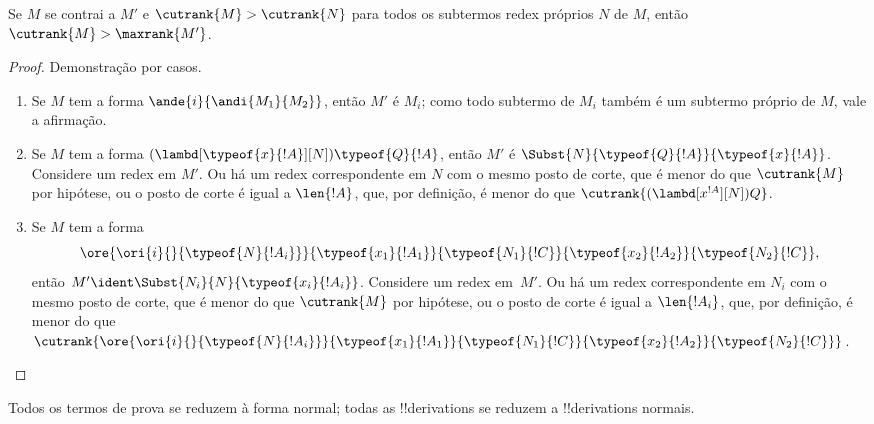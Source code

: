 \documentclass[../../../include/open-logic-section]{subfiles}
\begin{document}
\begin{lem}
  Se $M$ se contrai a $M'$ e $\cutrank{M} > \cutrank{N}$ para todos os
  subtermos redex próprios $N$ de $M$, então $\cutrank{M} >
  \maxrank{M'}$.
\end{lem}

\begin{proof}
  Demonstração por casos.
  \begin{enumerate}
  \item Se $M$ tem a forma $\ande{i}{\andi{M_1}{M_2}}$, então $M'$ é
    $M_i$; como todo subtermo de $M_i$ também é um subtermo próprio de
    $M$, vale a afirmação.
  \item Se $M$ tem a forma
    $(\lambd[\typeof{x}{!A}][N])\typeof{Q}{!A}$, então $M'$ é
    $\Subst{N}{\typeof{Q}{!A}}{\typeof{x}{!A}}$. Considere um redex em
    $M'$. Ou há um redex correspondente em $N$ com o mesmo posto de
    corte, que é menor do que $\cutrank{M}$ por hipótese, ou o posto de
    corte é igual a $\len{!A}$, que, por definição, é menor do que
    $\cutrank{(\lambd[x^{!A}][N])Q}$.
  \item Se $M$ tem a forma
    \[
    \ore{\ori{i}{}{\typeof{N}{!A_i}}}
        {\typeof{x_1}{!A_1}}{\typeof{N_1}{!C}}
        {\typeof{x_2}{!A_2}}{\typeof{N_2}{!C}},
    \]
    então $M' \ident \Subst{N_i}{N}{\typeof{x_i}{!A_i}}$. Considere um
    redex em~$M'$. Ou há um redex correspondente em $N_i$ com o mesmo
    posto de corte, que é menor do que $\cutrank{M}$ por hipótese, ou o
    posto de corte é igual a $\len{!A_i}$, que, por definição, é menor do que
    $\cutrank{\ore{\ori{i}{}{\typeof{N}{!A_i}}}
      {\typeof{x_1}{!A_1}}{\typeof{N_1}{!C}}
      {\typeof{x_2}{!A_2}}{\typeof{N_2}{!C}}}$.
  \end{enumerate}
\end{proof}

\begin{thm}
  Todos os termos de prova se reduzem à forma normal; todas as
  !!{derivation}s se reduzem a !!{derivation}s normais.
\end{thm}
\end{document}

